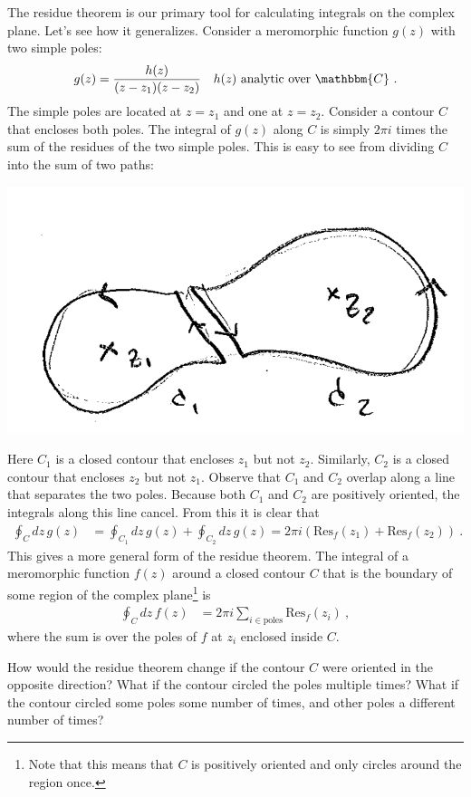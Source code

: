 The residue theorem is our primary tool for calculating integrals on the complex plane. Let's see how it generalizes. Consider a meromorphic function $g(z)$ with two simple poles:
\begin{align}
  g(z) &= \frac{h(z)}{(z-z_1)(z-z_2)} 
  &
  h(z) \text{ analytic over }\mathbbm{C} \ .
\end{align}
The simple poles are located at $z=z_1$ and one at $z=z_2$. Consider a contour $C$ that encloses both poles. The integral of $g(z)$ along $C$ is simply $2\pi i$ times the sum of the residues of the two simple poles. This is easy to see from dividing $C$ into the sum of two paths:
\begin{center}
\includegraphics[width=.5\textwidth]{figures/Lec_2017_13_2poles.png}
\end{center}
Here $C_1$ is a closed contour that encloses $z_1$ but not $z_2$. Similarly, $C_2$ is a closed contour that encloses $z_2$ but not $z_1$. Observe that $C_1$ and $C_2$ overlap along a line that separates the two poles. Because both $C_1$ and $C_2$ are positively oriented, the integrals along this line cancel. From this it is clear that
\begin{align}
  \oint_C dz\, g(z) &=
  \oint_{C_1} dz\, g(z) 
  +
  \oint_{C_2} dz\, g(z)
  = 2\pi i\left(\text{Res}_f(z_1) + \text{Res}_f(z_2)\right) \ .
\end{align}
This gives a more general form of the residue theorem. The integral of a meromorphic function $f(z)$ around a closed contour $C$ that is the boundary of some region of the complex plane\footnote{Note that this means that $C$ is positively oriented and only circles around the region once.} is
\begin{align}
  \oint_C dz\, f(z) &= 2\pi i \sum_{i\in \text{poles}} \text{Res}_f(z_i) \ ,
\end{align}
where the sum is over the poles of $f$ at $z_i$ enclosed inside $C$.
\begin{exercise}
How would the residue theorem change if the contour $C$ were oriented in the opposite direction? What if the contour circled the poles multiple times? What if the contour circled some poles some number of times, and other poles a different number of times?
\end{exercise}

